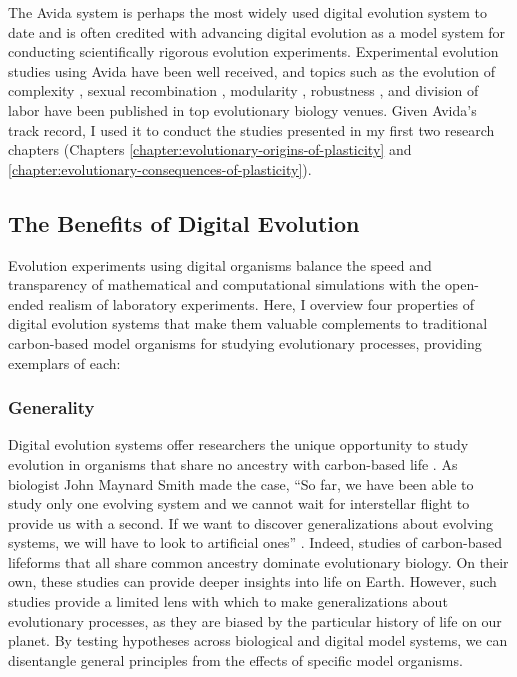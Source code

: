 The Avida system is perhaps the most widely used digital evolution system to date and is often credited with advancing digital evolution as a model system for conducting scientifically rigorous evolution experiments.
Experimental evolution studies using Avida have been well received, and topics such as the evolution of complexity \citep{adami_evolution_2000,lenski_evolutionary_2003}, sexual recombination \citep{misevic_experiments_2010}, modularity \citep{misevic_sexual_2006}, robustness \citep{lenski_genome_1999,elena_effects_2007}, and division of labor \citep{goldsby_task-switching_2012,goldsby_evolutionary_2014} have been published in top evolutionary biology venues.
Given Avida's track record, I used it to conduct the studies presented in my first two research chapters (Chapters \ref{chapter:evolutionary-origins-of-plasticity} and \ref{chapter:evolutionary-consequences-of-plasticity}).

\subsection{The Benefits of Digital Evolution}

Evolution experiments using digital organisms balance the speed and transparency of mathematical and computational simulations with the open-ended realism of laboratory experiments. 
Here, I overview four properties of digital evolution systems that make them valuable complements to traditional carbon-based model organisms for studying evolutionary processes, providing exemplars of each:

\subsubsection{Generality}

Digital evolution systems offer researchers the unique opportunity to study evolution in organisms that share no ancestry with carbon-based life \citep{wilke_biology_2002}.
As biologist John Maynard Smith made the case, ``So far, we have been able to study only one evolving system and we cannot wait for interstellar flight to provide us with a second. If we want to discover generalizations about evolving systems, we will have to look to artificial ones'' \citep{maynard_smith_byte-sized_1992}.
Indeed, studies of carbon-based lifeforms that all share common ancestry dominate evolutionary biology.
On their own, these studies can provide deeper insights into life on Earth. 
However, such studies provide a limited lens with which to make generalizations about evolutionary processes, as they are biased by the particular history of life on our planet.
By testing hypotheses across biological and digital model systems, we can disentangle general principles from the effects of specific model organisms.  

